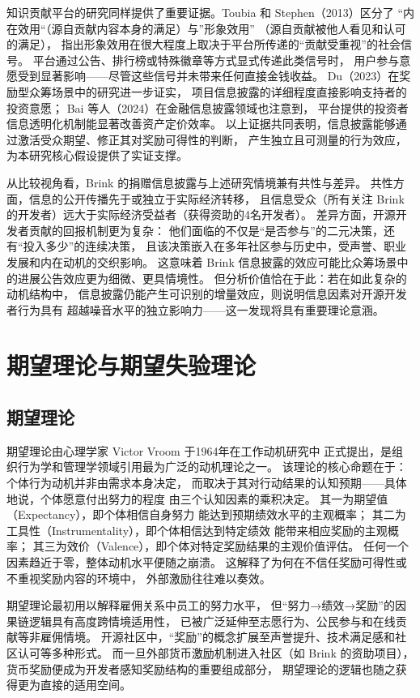 知识贡献平台的研究同样提供了重要证据。Toubia 和 Stephen（2013）区分了
“内在效用“（源自贡献内容本身的满足）与”形象效用”
（源自贡献被他人看见和认可的满足），
指出形象效用在很大程度上取决于平台所传递的“贡献受重视”的社会信号\cite{toubia2013intrinsic}。
平台通过公告、排行榜或特殊徽章等方式显式传递此类信号时，
用户参与意愿受到显著影响——尽管这些信号并未带来任何直接金钱收益。
Du（2023）在奖励型众筹场景中的研究进一步证实，
项目信息披露的详细程度直接影响支持者的投资意愿\cite{du2023impact}；
Bai 等人（2024）在金融信息披露领域也注意到，
平台提供的投资者信息透明化机制能显著改善资产定价效率\cite{bai2024platform}。
以上证据共同表明，信息披露能够通过激活受众期望、修正其对奖励可得性的判断，
产生独立且可测量的行为效应，为本研究核心假设提供了实证支撑。

从比较视角看，Brink 的捐赠信息披露与上述研究情境兼有共性与差异。
共性方面，信息的公开传播先于或独立于实际经济转移，
且信息受众（所有关注 Brink 的开发者）远大于实际经济受益者（获得资助的4名开发者）。
差异方面，开源开发者贡献的回报机制更为复杂：
他们面临的不仅是“是否参与”的二元决策，还有“投入多少”的连续决策，
且该决策嵌入在多年社区参与历史中，受声誉、职业发展和内在动机的交织影响。
这意味着 Brink 信息披露的效应可能比众筹场景中的进展公告效应更为细微、更具情境性。
但分析价值恰在于此：若在如此复杂的动机结构中，
信息披露仍能产生可识别的增量效应，则说明信息因素对开源开发者行为具有
超越噪音水平的独立影响力——这一发现将具有重要理论意涵。

\section{期望理论与期望失验理论}

\subsection{期望理论}

期望理论由心理学家 Victor Vroom 于1964年在工作动机研究中
正式提出\cite{vroom1964work}，是组织行为学和管理学领域引用最为广泛的动机理论之一。
该理论的核心命题在于：个体行为动机并非由需求本身决定，
而取决于其对行动结果的认知预期——具体地说，个体愿意付出努力的程度
由三个认知因素的乘积决定。
其一为期望值（Expectancy），即个体相信自身努力
能达到预期绩效水平的主观概率；
其二为工具性（Instrumentality），即个体相信达到特定绩效
能带来相应奖励的主观概率；
其三为效价（Valence），即个体对特定奖励结果的主观价值评估。
任何一个因素趋近于零，整体动机水平便随之崩溃。
这解释了为何在不信任奖励可得性或不重视奖励内容的环境中，
外部激励往往难以奏效。

期望理论最初用以解释雇佣关系中员工的努力水平，
但“努力→绩效→奖励”的因果链逻辑具有高度跨情境适用性，
已被广泛延伸至志愿行为、公民参与和在线贡献等非雇佣情境。
开源社区中，“奖励”的概念扩展至声誉提升、技术满足感和社区认可等多种形式。
而一旦外部货币激励机制进入社区（如 Brink 的资助项目），
货币奖励便成为开发者感知奖励结构的重要组成部分，
期望理论的逻辑也随之获得更为直接的适用空间。


